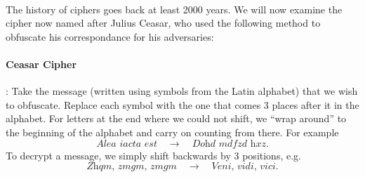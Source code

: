 \documentclass{article}
\theoremstyle{definition}
\begin{document}
\paragraph{}
The history of ciphers goes back at least 2000 years. We will now examine the
cipher now named after Julius Ceasar, who used the following method to obfuscate
his correspondance for his adversaries:
\paragraph{Ceasar Cipher}: Take the message (written using symbols from the
Latin alphabet) that we wish to obfuscate. Replace each symbol with the one that
comes 3 places after it in the alphabet. For letters at the end where we could
not shift, we ``wrap around'' to the beginning of the alphabet and carry on
counting from there. For example
\[
  \textit{Alea iacta est} \quad\to\quad \textit{Dohd mdfzd hxz}.
\]
To decrypt a message, we simply shift backwards by 3 positions, e.g.
\[
  \textit{Zhqm, zmgm, zmgm} \quad\to\quad \textit{Veni, vidi, vici}.
\]
\end{document}
